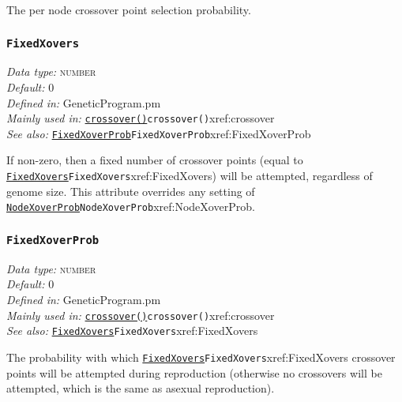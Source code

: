 \documentclass[a4paper]{article}
\begin{document}
The per node crossover point selection probability.

\subsubsection{\texttt{FixedXovers}}\label{xref:FixedXovers}
\begin{flushleft}
\textit{Data type:} \textsc{number}\\
\textit{Default:} 0\\
\textit{Defined in:} GeneticProgram.pm\\
\textit{Mainly used in:} \hyperref[no]{\texttt{crossover()}}{\texttt{crossover()}}{xref:crossover}\\
\textit{See also:} \hyperref[no]{\texttt{FixedXoverProb}}{\texttt{FixedXoverProb}}{xref:FixedXoverProb}
\end{flushleft}

If non-zero, then a fixed number of crossover points (equal to
\hyperref[no]{\texttt{FixedXovers}}{\texttt{FixedXovers}}{xref:FixedXovers}) will be attempted, regardless of genome size.
This attribute overrides any setting of \hyperref[no]{\texttt{NodeXoverProb}}{\texttt{NodeXoverProb}}{xref:NodeXoverProb}.

\subsubsection{\texttt{FixedXoverProb}}\label{xref:FixedXoverProb}
\begin{flushleft}
\textit{Data type:} \textsc{number}\\
\textit{Default:} 0\\
\textit{Defined in:} GeneticProgram.pm\\
\textit{Mainly used in:} \hyperref[no]{\texttt{crossover()}}{\texttt{crossover()}}{xref:crossover}\\
\textit{See also:} \hyperref[no]{\texttt{FixedXovers}}{\texttt{FixedXovers}}{xref:FixedXovers}
\end{flushleft}

The probability with which \hyperref[no]{\texttt{FixedXovers}}{\texttt{FixedXovers}}{xref:FixedXovers} crossover points will
be attempted during reproduction (otherwise no crossovers will be
attempted, which is the same as asexual reproduction).
\end{document}
